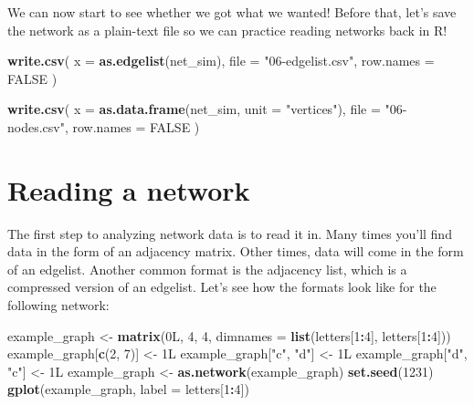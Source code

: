\documentclass[]{book}
\newenvironment{Shaded}{\begin{snugshade}}{\end{snugshade}}
\newcommand{\DataTypeTok}[1]{\textcolor[rgb]{0.13,0.29,0.53}{#1}}
\newcommand{\DecValTok}[1]{\textcolor[rgb]{0.00,0.00,0.81}{#1}}
\newcommand{\KeywordTok}[1]{\textcolor[rgb]{0.13,0.29,0.53}{\textbf{#1}}}
\newcommand{\NormalTok}[1]{#1}
\newcommand{\OperatorTok}[1]{\textcolor[rgb]{0.81,0.36,0.00}{\textbf{#1}}}
\newcommand{\OtherTok}[1]{\textcolor[rgb]{0.56,0.35,0.01}{#1}}
\newcommand{\StringTok}[1]{\textcolor[rgb]{0.31,0.60,0.02}{#1}}
\begin{document}
We can now start to see whether we got what we wanted! Before that, let's save the
network as a plain-text file so we can practice reading networks back in R!

\begin{Shaded}
\begin{Highlighting}[]
\KeywordTok{write.csv}\NormalTok{(}
  \DataTypeTok{x         =} \KeywordTok{as.edgelist}\NormalTok{(net_sim),}
  \DataTypeTok{file      =} \StringTok{"06-edgelist.csv"}\NormalTok{,}
  \DataTypeTok{row.names =} \OtherTok{FALSE}
\NormalTok{  )}

\KeywordTok{write.csv}\NormalTok{(}
  \DataTypeTok{x         =} \KeywordTok{as.data.frame}\NormalTok{(net_sim, }\DataTypeTok{unit =} \StringTok{"vertices"}\NormalTok{),}
  \DataTypeTok{file      =} \StringTok{"06-nodes.csv"}\NormalTok{,}
  \DataTypeTok{row.names =} \OtherTok{FALSE}
\NormalTok{  )}
\end{Highlighting}
\end{Shaded}

\hypertarget{reading-a-network}{%
\section{Reading a network}\label{reading-a-network}}

The first step to analyzing network data is to read it in. Many times you'll find
data in the form of an adjacency matrix. Other times, data will come in the form
of an edgelist. Another common format is the adjacency list, which is a compressed
version of an edgelist. Let's see how the formats look like for the following
network:

\begin{Shaded}
\begin{Highlighting}[]
\NormalTok{example_graph <-}\StringTok{ }\KeywordTok{matrix}\NormalTok{(0L, }\DecValTok{4}\NormalTok{, }\DecValTok{4}\NormalTok{, }\DataTypeTok{dimnames =} \KeywordTok{list}\NormalTok{(letters[}\DecValTok{1}\OperatorTok{:}\DecValTok{4}\NormalTok{], letters[}\DecValTok{1}\OperatorTok{:}\DecValTok{4}\NormalTok{]))}
\NormalTok{example_graph[}\KeywordTok{c}\NormalTok{(}\DecValTok{2}\NormalTok{, }\DecValTok{7}\NormalTok{)] <-}\StringTok{ }\NormalTok{1L}
\NormalTok{example_graph[}\StringTok{"c"}\NormalTok{, }\StringTok{"d"}\NormalTok{] <-}\StringTok{ }\NormalTok{1L}
\NormalTok{example_graph[}\StringTok{"d"}\NormalTok{, }\StringTok{"c"}\NormalTok{] <-}\StringTok{ }\NormalTok{1L}
\NormalTok{example_graph <-}\StringTok{ }\KeywordTok{as.network}\NormalTok{(example_graph)}
\KeywordTok{set.seed}\NormalTok{(}\DecValTok{1231}\NormalTok{)}
\KeywordTok{gplot}\NormalTok{(example_graph, }\DataTypeTok{label =}\NormalTok{ letters[}\DecValTok{1}\OperatorTok{:}\DecValTok{4}\NormalTok{])}
\end{Highlighting}
\end{Shaded}
\end{document}

